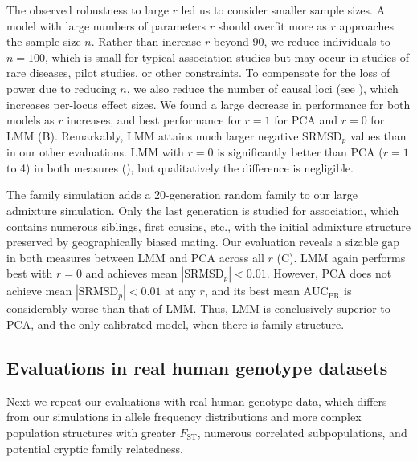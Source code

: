 \documentclass[9pt,lineno]{elife}
\newcommand{\Fst}{F_{\text{ST}}}
\newcommand{\rmsd}{\text{SRMSD}_p}
\newcommand{\auc}{\text{AUC}_\text{PR}}
\begin{document}
The observed robustness to large $r$ led us to consider smaller sample sizes.
A model with large numbers of parameters $r$ should overfit more as $r$ approaches the sample size $n$.
Rather than increase $r$ beyond 90, we reduce individuals to $n = 100$, which is small for typical association studies but may occur in studies of rare diseases, pilot studies, or other constraints.
To compensate for the loss of power due to reducing $n$, we also reduce the number of causal loci (see ), which increases per-locus effect sizes.
We found a large decrease in performance for both models as $r$ increases, and best performance for $r=1$ for PCA and $r=0$ for LMM (B).
Remarkably, LMM attains much larger negative $\rmsd$ values than in our other evaluations.
LMM with $r=0$ is significantly better than PCA ($r=1$ to 4) in both measures (), but qualitatively the difference is negligible.

The family simulation adds a 20-generation random family to our large admixture simulation.
Only the last generation is studied for association, which contains numerous siblings, first cousins, etc., with the initial admixture structure preserved by geographically biased mating.
Our evaluation reveals a sizable gap in both measures between LMM and PCA across all $r$ (C).
LMM again performs best with $r=0$ and achieves mean $|\rmsd| < 0.01$.
However, PCA does not achieve mean $|\rmsd| < 0.01$ at any $r$, and its best mean $\auc$ is considerably worse than that of LMM.
Thus, LMM is conclusively superior to PCA, and the only calibrated model, when there is family structure.

\subsection{Evaluations in real human genotype datasets}

Next we repeat our evaluations with real human genotype data, which differs from our simulations in allele frequency distributions and more complex population structures with greater $\Fst$, numerous correlated subpopulations, and potential cryptic family relatedness.
\end{document}
